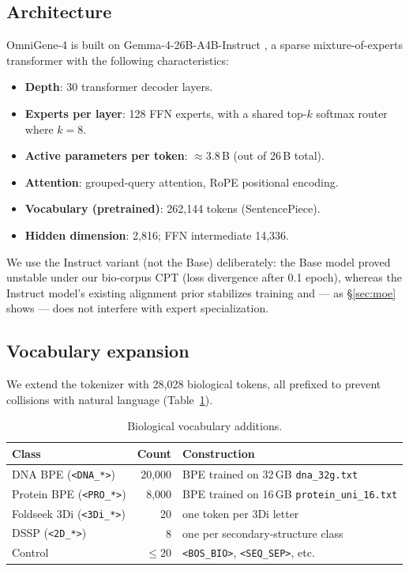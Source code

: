 \documentclass[11pt]{article}
\begin{document}
\subsection{Architecture}

OmniGene-4 is built on Gemma-4-26B-A4B-Instruct \citep{gemmateam2025}, a sparse mixture-of-experts transformer with the following characteristics:
\begin{itemize}\setlength\itemsep{0pt}
\item \textbf{Depth}: 30 transformer decoder layers.
\item \textbf{Experts per layer}: 128 FFN experts, with a shared top-$k$ softmax router where $k=8$.
\item \textbf{Active parameters per token}: $\approx 3.8$\,B (out of 26\,B total).
\item \textbf{Attention}: grouped-query attention, RoPE positional encoding.
\item \textbf{Vocabulary (pretrained)}: 262{,}144 tokens (SentencePiece).
\item \textbf{Hidden dimension}: 2{,}816; FFN intermediate 14{,}336.
\end{itemize}

We use the Instruct variant (not the Base) deliberately: the Base model proved unstable under our bio-corpus CPT (loss divergence after 0.1 epoch), whereas the Instruct model's existing alignment prior stabilizes training and --- as \S\ref{sec:moe} shows --- does not interfere with expert specialization.

\subsection{Vocabulary expansion}

We extend the tokenizer with 28{,}028 biological tokens, all prefixed to prevent collisions with natural language (Table~\ref{tab:vocab}).

\begin{table}[H]
\centering
\small
\caption{Biological vocabulary additions.}
\label{tab:vocab}
\begin{tabular}{lrl}
\toprule
\textbf{Class} & \textbf{Count} & \textbf{Construction} \\
\midrule
DNA BPE (\texttt{<DNA\_*>})   & 20{,}000 & BPE \citep{sennrich2016bpe} trained on 32\,GB \texttt{dna\_32g.txt} \\
Protein BPE (\texttt{<PRO\_*>}) &  8{,}000 & BPE trained on 16\,GB \texttt{protein\_uni\_16.txt} \\
Foldseek 3Di (\texttt{<3Di\_*>})  &     20 & one token per 3Di letter \citep{vankempen2024foldseek} \\
DSSP (\texttt{<2D\_*>})        &      8 & one per secondary-structure class \citep{kabsch1983dssp} \\
Control                      & $\leq 20$ & \texttt{<BOS\_BIO>}, \texttt{<SEQ\_SEP>}, etc. \\
\bottomrule
\end{tabular}
\end{table}
\end{document}
